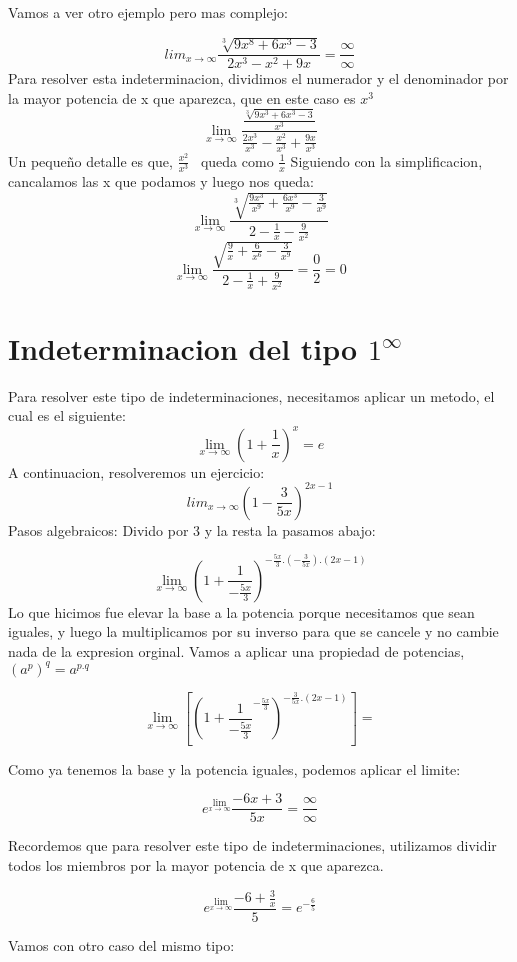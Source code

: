 \documentclass{article}
\begin{document}
Vamos a ver otro ejemplo pero mas complejo: 

$$ lim_{x \to \infty} \frac{\sqrt[3]{9x^8+6x^3-3}}{2x^3-x^2+9x} = \frac{\infty}{\infty}$$
Para resolver esta indeterminacion, dividimos el numerador y el denominador por la mayor potencia de x que aparezca, que en este caso es $x^3$
$$ \lim_{x \to \infty} \frac{\frac{\sqrt[3]{9x^3+6x^3-3}}{x^3}}{\frac{2x^3}{x^3}-\frac{x^2}{x^3}+\frac{9x}{x^3}}  $$
Un pequeño detalle es que, $\frac{x^2}{x^3} $ \ queda como $\frac{1}{x}$
Siguiendo con la simplificacion, cancalamos las x que podamos y luego nos queda: 
$$ \lim_{x \to \infty} \frac{\sqrt[3]{\frac{9x^3}{x^9}+\frac{6x^3}{x^9}-\frac{3}{x^9}}}{2-\frac{1}{x}-\frac{9}{x^2}}$$
$$ \lim_{x \to \infty} \frac{\sqrt{\frac{9}{x}+\frac{6}{x^6}-\frac{3}{x^9}}}{2-\frac{1}{x}+\frac{9}{x^2}} = \frac{0}{2} = 0$$

\section{Indeterminacion del tipo $1^\infty$}
Para resolver este tipo de indeterminaciones, necesitamos aplicar un metodo, el cual es el siguiente: 
$$ \lim_{x \to \infty} \left( 1+ \frac{1}{x} \right)^x = e $$
A continuacion, resolveremos un ejercicio: 
$$ lim_{x \to \infty} \left( 1- \frac{3}{5x}\right)^{2x-1} $$
Pasos algebraicos:
Divido por 3 y la resta la pasamos abajo: 

$$ \lim_{x \to \infty} \left( 1+ \frac{1}{-\frac{5x}{3}}\right)^{-\frac{5x}{3}.(-\frac{3}{5x}).(2x-1)}$$
Lo que hicimos fue elevar la base a la potencia porque necesitamos que sean iguales, y luego la multiplicamos por su inverso para que se cancele y no cambie nada de la expresion orginal.
\newpage
Vamos a aplicar una propiedad de potencias, $(a^p)^q = a^{p.q}$ 

$$ \lim_{x \to \infty} \left[\left(1+\frac{1}{-\frac{5x}{3}}^{-\frac{5x}{3}}\right)^{-\frac{3}{5x}.(2x-1)}\right] = $$

Como ya tenemos la base y la potencia iguales, podemos aplicar el limite: 

$$ e^{\lim_{x \to \infty}} \frac{-6x+3}{5x}= \frac{\infty}{\infty}$$

Recordemos que para resolver este tipo de indeterminaciones, utilizamos dividir todos los miembros por la mayor potencia de x que aparezca.

$$ e^{ \lim_{x \to \infty}} \frac{-6+\frac{3}{x}}{5} = e^{-\frac{6}{5}}$$

Vamos con otro caso del mismo tipo:
\end{document}
